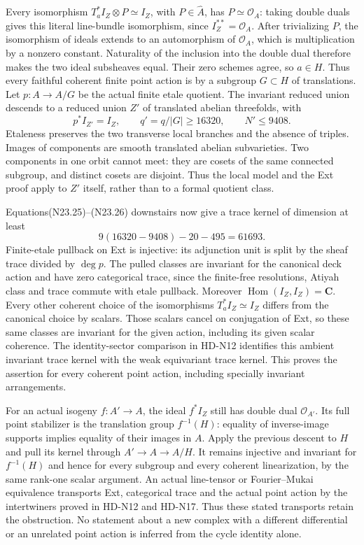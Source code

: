 Every isomorphism $T_a^*I_Z\otimes P\simeq I_Z$, with
$P\in\widehat A$, has $P\simeq\mathcal O_A$: taking double
duals gives this literal line-bundle isomorphism, since
$I_Z^{**}=\mathcal O_A$. After trivializing $P$, the isomorphism
of ideals extends to an automorphism of $\mathcal O_A$, which is
multiplication by a nonzero constant. Naturality of the inclusion
into the double dual therefore makes the two ideal subsheaves
equal. Their zero schemes agree, so $a\in H$.
Thus every faithful coherent finite point action is by a subgroup
$G\subset H$ of translations. Let $p:A\to A/G$ be the actual
finite etale quotient. The invariant reduced union descends to
a reduced union $Z'$ of translated abelian threefolds, with
\[
            p^*I_{Z'}=I_Z,\qquad q'=q/|G|\ge16320,
                                      \qquad N'\le9408.     \tag{N23.28}
\]
Etaleness preserves the two transverse local branches and the
absence of triples. Images of components are smooth translated
abelian subvarieties. Two components in one orbit cannot meet:
they are cosets of the same connected subgroup, and distinct
cosets are disjoint. Thus the local model and the Ext proof
apply to $Z'$ itself, rather than to a formal quotient class.

Equations(N23.25)--(N23.26) downstairs now give a trace kernel
of dimension at least
\[
                 9(16320-9408)-20-495=61693.                 \tag{N23.29}
\]
Finite-etale pullback on Ext is injective: its adjunction unit
is split by the sheaf trace divided by $\deg p$. The pulled
classes are invariant for the canonical deck action and have
zero categorical trace, since the finite-free resolutions,
Atiyah class and trace commute with etale pullback.
Moreover $\operatorname{Hom}(I_Z,I_Z)=\mathbf C$.
Every other coherent choice of the isomorphisms
$T_a^*I_Z\simeq I_Z$ differs from the canonical choice by
scalars. Those scalars cancel on conjugation of Ext, so these
same classes are invariant for the given action, including its
given scalar coherence. The identity-sector comparison in
HD-N12 identifies this ambient invariant trace kernel with
the weak equivariant trace kernel. This proves the assertion
for every coherent point action, including specially invariant
arrangements.

For an actual isogeny $f:A'\to A$, the ideal $f^*I_Z$ still
has double dual $\mathcal O_{A'}$. Its full point stabilizer
is the translation group $f^{-1}(H)$: equality of inverse-image
supports implies equality of their images in $A$. Apply the
previous descent to $H$ and pull its kernel through
$A'\to A\to A/H$. It remains injective and invariant for
$f^{-1}(H)$ and hence for every subgroup and every coherent
linearization, by the same rank-one scalar argument.
An actual line-tensor or Fourier--Mukai equivalence transports
Ext, categorical trace and the actual point action by the
intertwiners proved in HD-N12 and HD-N17. Thus these stated
transports retain the obstruction. No statement about a new
complex with a different differential or an unrelated point
action is inferred from the cycle identity alone.

